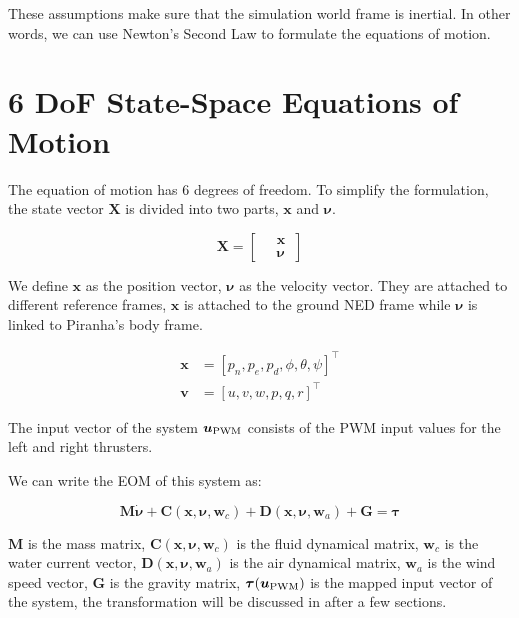 These assumptions make sure that the simulation world frame is inertial. In other words, we can use Newton's Second Law to formulate the equations of motion.

\section{6 DoF State-Space Equations of Motion}

The equation of motion has 6 degrees of freedom. To simplify the formulation, the state vector $\boldsymbol{X}$ is divided into two parts, $\boldsymbol{x}$ and $\boldsymbol{\nu}$.

\begin{equation}
    \boldsymbol{X}=\left[\begin{aligned}
        &\ \boldsymbol{x}\ \\
        &\ \boldsymbol{\nu}\
    \end{aligned}\right]
\end{equation}

We define $\boldsymbol{x}$ as the position vector, $\boldsymbol{\nu}$ as the velocity vector. They are attached to different reference frames, $\boldsymbol{x}$ is attached to the ground NED frame while $\boldsymbol{\nu}$ is linked to Piranha's body frame.

\begin{align}
    \boldsymbol{x} & =[p_n, p_e, p_d, \phi, \theta, \psi]^\top \\
    \boldsymbol{v} & =[u, v, w, p, q, r]^\top
\end{align}

The input vector of the system $\boldsymbol{u}_{\rm PWM}$ consists of the PWM input values for the left and right thrusters. 

We can write the EOM of this system as:

\begin{equation}
    \boldsymbol{M\dot{\nu}}+\boldsymbol{C}(\boldsymbol{x},\boldsymbol{\nu},\boldsymbol{w}_c)+\boldsymbol{D}(\boldsymbol{x}, \boldsymbol{\nu}, \boldsymbol{w}_a)+\boldsymbol{G}=\boldsymbol{\tau}
\end{equation}

$\boldsymbol{M}$ is the mass matrix, $\boldsymbol{C}(\boldsymbol{x},\boldsymbol{\nu},\boldsymbol{w}_c)$ is the fluid dynamical matrix, $\boldsymbol{w}_c$ is the water current vector, $\boldsymbol{D}(\boldsymbol{x}, \boldsymbol{\nu}, \boldsymbol{w}_a)$ is the air dynamical matrix, $\boldsymbol{w}_a$ is the wind speed vector, $\boldsymbol{G}$ is the gravity matrix, $\boldsymbol{\tau}(\boldsymbol{u}_{\rm PWM})$ is the mapped input vector of the system, the transformation will be discussed in after a few sections.

